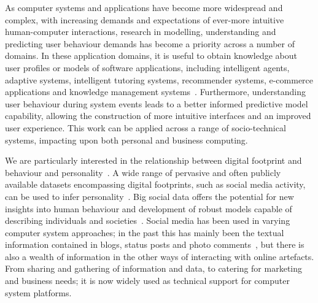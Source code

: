 \documentclass[graybox]{svmult}
\begin{document}
As computer systems and applications have become more widespread and
complex, with increasing demands and expectations of ever-more
intuitive human-computer interactions, research in modelling,
understanding and predicting user behaviour demands has become a
priority across a number of domains.  In these application domains, it
is useful to obtain knowledge about user profiles or models of
software applications, including intelligent agents, adaptive systems,
intelligent tutoring systems, recommender systems, e-commerce
applications and knowledge management
systems~\cite{schiaffino+amandi:2009}. Furthermore, understanding user
behaviour during system events leads to a better informed predictive
model capability, allowing the construction of more intuitive
interfaces and an improved user experience. This work can be applied
across a range of socio-technical systems, impacting upon both
personal and business computing.

We are particularly interested in the relationship between digital
footprint and behaviour and
personality~\citep{oatley+crick:2014,oatley-et-al_dasc2015,blamey-et-al-2012,blamey-et-al-2013}. A
wide range of pervasive and often publicly available datasets
encompassing digital footprints, such as social media activity, can be
used to infer
personality~\citep{lambiotte+kosinski:2014,oatley-et-al-soccogcomp2015}. Big
social data offers the potential for new insights into human behaviour
and development of robust models capable of describing individuals and
societies~\citep{lazer-et-al:2009}. Social media has been used in
varying computer system approaches; in the past this has mainly been
the textual information contained in blogs, status posts and photo
comments~\cite{blamey-et-al-2012,blamey-et-al-2013}, but there is also
a wealth of information in the other ways of interacting with online
artefacts. From sharing and gathering of information and data, to
catering for marketing and business needs; it is now widely used as
technical support for computer system platforms.


\end{document}
